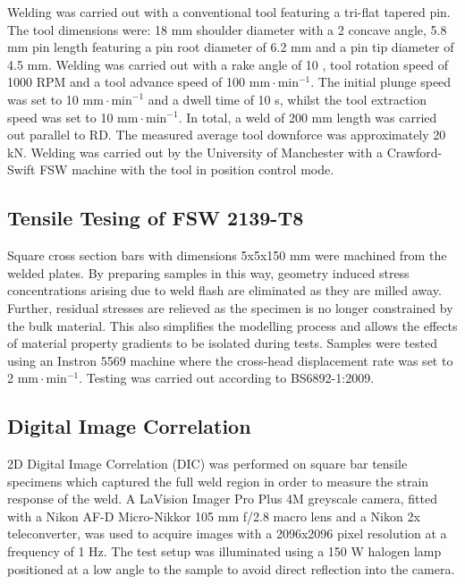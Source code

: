 Welding was carried out with a conventional tool featuring a tri-flat tapered pin. The tool dimensions were: 18 mm shoulder diameter with a 2 \degree concave angle, 5.8 mm pin length featuring a pin root diameter of 6.2 mm and a pin tip diameter of 4.5 mm. Welding was carried out with a rake angle of 10 \degree, tool rotation speed of 1000 RPM and a tool advance speed of 100 $\text{mm}\!\cdot\!\text{min}^{-1}$. The initial plunge speed was set to 10 $\text{mm}\!\cdot\!\text{min}^{-1}$ and a dwell time of 10 s, whilst the tool extraction speed was set to 10 $\text{mm}\!\cdot\!\text{min}^{-1}$. In total, a weld of 200 mm length was carried out parallel to RD. The measured average tool downforce was approximately 20 kN. Welding was carried out by the University of Manchester with a Crawford-Swift FSW machine with the tool in position control mode.

\subsection{Tensile Tesing of FSW 2139-T8}
\label{EMTensileTesting}
Square cross section bars with dimensions 5x5x150 mm were machined from the welded plates. By preparing samples in this way, geometry induced stress concentrations arising due to weld flash are eliminated as they are milled away. Further, residual stresses are relieved as the specimen is no longer constrained by the bulk material. This also simplifies the modelling process and allows the effects of material property gradients to be isolated during tests. Samples were tested using an Instron 5569 machine where the cross-head displacement rate was set to 2 $\text{mm}\!\cdot\!\text{min}^{-1}$. Testing was carried out according to BS6892-1:2009.
\subsection{Digital Image Correlation}
\label{EMDIC}
2D Digital Image Correlation (DIC)  \cite{DaFonseca2005} was performed on square bar tensile specimens which captured the full weld region in order to measure the strain response of the weld. A LaVision Imager Pro Plus 4M greyscale camera, fitted with a Nikon AF-D Micro-Nikkor 105 mm f/2.8 macro lens and a Nikon 2x teleconverter, was used to acquire images with a 2096x2096 pixel resolution at a frequency of 1 Hz. The test setup was illuminated using a 150 W halogen lamp positioned at a low angle to the sample to avoid direct reflection into the camera. 

